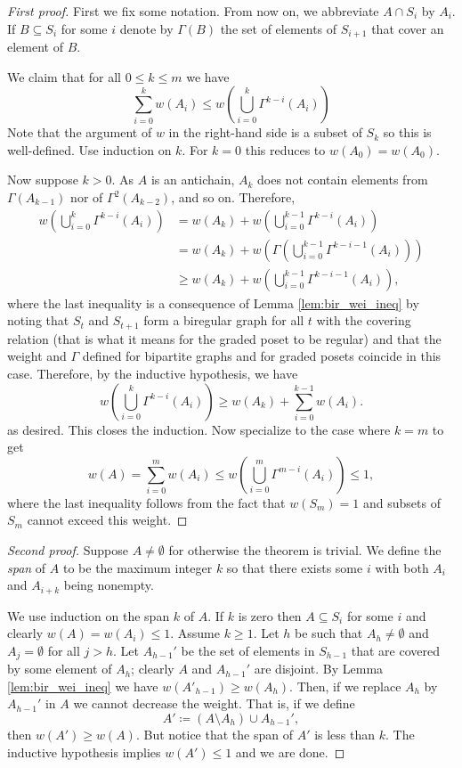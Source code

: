 \documentclass{report}
\theoremstyle{definition}
\theoremstyle{plain}
\theoremstyle{definition}
\begin{document}
 	\begin{proof}[First proof]		
 		First we fix some notation. From now on, we abbreviate $A\cap S_i$ by $A_i$. If $B \subseteq S_i$ for some $i$ denote by $\Gamma(B)$ the set of elements of $S_{i+1}$ that cover an element of $B$.
 		
 		We claim that for all $0\leq k \leq m$ we have
 		\[
 			\sum_{i=0}^{k}w(A_i)\leq w\left(\bigcup_{i = 0}^{k} \Gamma^{k-i}(A_i)\right)
 		\]
 		Note that the argument of $w$ in the right-hand side is a subset of $S_k$ so this is well-defined. Use induction on $k$. For $k = 0$ this reduces to $w(A_0) = w(A_0)$. 
 		
 		Now suppose $k>0$. As $A$ is an antichain, $A_{k}$ does not contain elements from $\Gamma(A_{k-1})$ nor of $\Gamma^2(A_{k-2})$, and so on. Therefore, 
 		\begin{align*}
 			w\left(\bigcup_{i = 0}^{k} \Gamma^{k-i}(A_i)\right) &= w(A_k) + w\left(\bigcup_{i = 0}^{k-1} \Gamma^{k-i}(A_i)\right)\\
 			&= w(A_k) + w\left(\Gamma\left(\bigcup_{i = 0}^{k-1} \Gamma^{k-i-1}(A_i)\right)\right)\\
 			&\geq w(A_k) + w\left(\bigcup_{i = 0}^{k-1} \Gamma^{k-i-1}(A_i)\right),
 		\end{align*}
 		where the last inequality is a consequence of Lemma \ref{lem:bir_wei_ineq} by noting that $S_t$ and $S_{t+1}$ form a biregular graph for all $t$ with the covering relation (that is what it means for the graded poset to be regular) and that the weight and $\Gamma$ defined for bipartite graphs and for graded posets coincide in this case. Therefore, by the inductive hypothesis, we have
 		\[
 		w\left(\bigcup_{i = 0}^{k} \Gamma^{k-i}(A_i)\right)\geq w(A_k) + \sum_{i=0}^{k-1}w(A_i).
 		\]
 		as desired. This closes the induction. Now specialize to the case where $k = m$ to get
 		\[
 			w(A) = \sum_{i=0}^{m}w(A_i)\leq w\left(\bigcup_{i = 0}^{m} \Gamma^{m-i}(A_i)\right) \leq 1,
 		\]
 		where the last inequality follows from the fact that $w(S_m)=1$ and subsets of $S_m$ cannot exceed this weight.
 	\end{proof}
 	\begin{proof}[Second proof]
 		Suppose $A\neq \emptyset$ for otherwise the theorem is trivial. We define the \emph{span} of $A$ to be the maximum integer $k$ so that there exists some $i$ with both $A_i$ and $A_{i+k}$ being nonempty.
 		
 		We use induction on the span $k$ of $A$. If $k$ is zero then $A\subseteq S_i$ for some $i$ and clearly $w(A) = w(A_i)\leq 1$. Assume $k\geq 1$. Let $h$ be such that $A_h\neq \emptyset$ and $A_j=\emptyset$ for all $j>h$. Let $A_{h-1}'$ be the set of elements in $S_{h-1}$ that are covered by some element of $A_h$; clearly $A$ and $A_{h-1}'$ are disjoint. By Lemma \ref{lem:bir_wei_ineq} we have $w(A'_{h-1}) \geq w(A_h)$. Then, if we replace $A_h$ by $A_{h-1}'$ in $A$ we cannot decrease the weight. That is, if we define 
 		\[
 			A' \coloneqq (A\setminus A_h)\cup A_{h-1}',
 		\]
 		then $w(A') \geq w(A)$. But notice that the span of $A'$ is less than $k$. The inductive hypothesis implies $w(A')\leq 1$ and we are done.
 	\end{proof}
\end{document}
